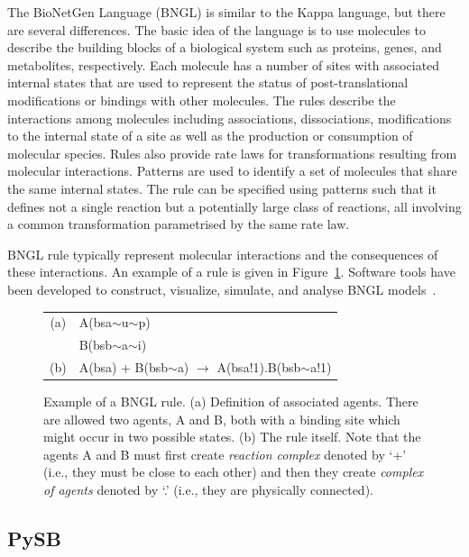 \documentclass[11pt,a4paper]{report}
\begin{document}
The BioNetGen Language (BNGL) \cite{harris2016bionetgen} is similar to the Kappa language, but there are several differences. The basic idea of the language is to use molecules to describe the building blocks of a biological system such as proteins, genes, and metabolites, respectively. Each molecule has a number of sites with associated internal states that are used to represent the status of post-translational modifications or bindings with other molecules. The rules describe the interactions among molecules including associa­tions, dissociations, modifications to the internal state of a site as well as the production or consumption of molecular species. Rules also provide rate laws for transformations resulting from molecular interactions. Patterns are used to identify a set of molecules that share the same internal states. The rule can be specified using patterns such that it defines not a single reaction but a potentially large class of reactions, all involving a common transformation parametrised by the same rate law.

BNGL rule typically represent molecular interactions and the consequences of these interactions. An example of a rule is given in Figure~\ref{bngl-rule}. Software tools have been developed to construct, visualize, simulate, and analyse BNGL models~\cite{wenskovitch2014mosbie,harris2016bionetgen,xu2011rulebender,sneddon2011efficient}.

\begin{figure}[!h]
\begin{center}
\begin{tabular}{c l}
(a) & A(bsa$\sim$u$\sim$p) \\
  & B(bsb$\sim$a$\sim$i) \\
(b) & A(bsa) + B(bsb$\sim$a) $\rightarrow$ A(bsa!1).B(bsb$\sim$a!1) \\
\end{tabular}
\end{center}
\caption{Example of a BNGL rule. (a) Definition of associated agents. There are allowed two agents, A and B, both with a binding site which might occur in two possible states. (b) The rule itself. Note that the agents A and B must first create \emph{reaction complex} denoted by `+' (i.e., they must be close to each other) and then they create \emph{complex of agents} denoted by `.' (i.e., they are physically connected).}\label{bngl-rule}
\end{figure}

\subsection{PySB}
\end{document}
